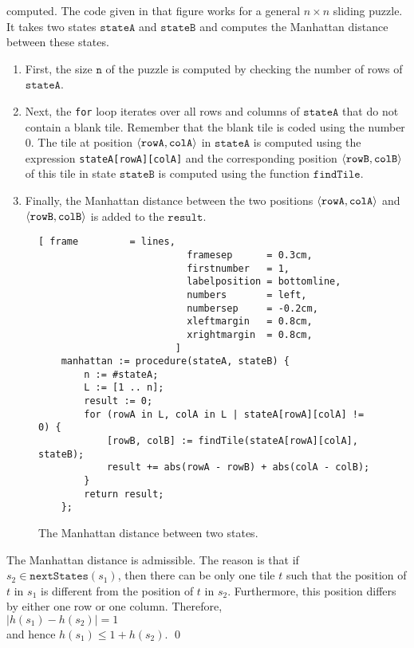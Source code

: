 \begin{enumerate}
      computed.  The code given in that figure works for a general $n \times n$ sliding puzzle.  It takes two
      states $\mathtt{stateA}$ and $\mathtt{stateB}$ and computes the Manhattan distance between these states.
      \begin{enumerate}
      \item First, the size $\mathtt{n}$ of the puzzle is computed by checking the number of rows of
            $\mathtt{stateA}$.
      \item Next, the \texttt{for} loop iterates over all rows and columns of $\mathtt{stateA}$ that do not
            contain a blank tile.  Remember that the blank tile is coded using the number $0$.  The tile at
            position $\pair(\mathtt{rowA}, \mathtt{colA})$ in $\mathtt{stateA}$ is computed using the expression \texttt{stateA[rowA][colA]} and the
            corresponding position $\pair(\mathtt{rowB}, \mathtt{colB})$ of this tile in state $\mathtt{stateB}$ is computed using the function
            $\mathtt{findTile}$.
      \item Finally, the Manhattan distance between the two positions $\pair(\mathtt{rowA}, \mathtt{colA})$ and
            $\pair(\mathtt{rowB}, \mathtt{colB})$ is added to the $\mathtt{result}$.
      \end{enumerate}

      \begin{figure}[!ht]
        \centering
        \begin{Verbatim}[ frame         = lines,
                          framesep      = 0.3cm,
                          firstnumber   = 1,
                          labelposition = bottomline,
                          numbers       = left,
                          numbersep     = -0.2cm,
                          xleftmargin   = 0.8cm,
                          xrightmargin  = 0.8cm,
                        ]
    manhattan := procedure(stateA, stateB) {
        n := #stateA;
        L := [1 .. n];
        result := 0;
        for (rowA in L, colA in L | stateA[rowA][colA] != 0) {
            [rowB, colB] := findTile(stateA[rowA][colA], stateB);
            result += abs(rowA - rowB) + abs(colA - colB);
        }
        return result;
    };
    \end{Verbatim}
    \vspace*{-0.3cm}
    \caption{The Manhattan distance between two states.}
    \label{fig:manhattan.stlx}
    \end{figure}

    The Manhattan distance is admissible.  The reason is that if $s_2 \in \mathtt{nextStates}(s_1)$,
    then there can be only one tile $t$ such that the position of $t$ in $s_1$ is different from the position
    of $t$ in $s_2$.  Furthermore, this position differs by either one row or one column.  Therefore,
    \\[0.2cm]
    \hspace*{1.3cm}
    $|h(s_1) - h(s_2)| = 1$
    \\[0.2cm]
    and hence $h(s_1) \leq 1 + h(s_2)$.  \qed
\end{enumerate}
